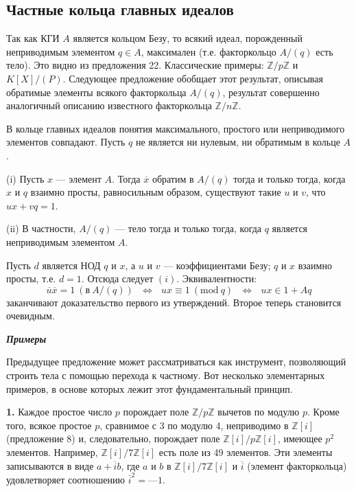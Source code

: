 \documentclass{mai_book}
\begin{document}
\subsection{Частные кольца главных идеалов}
Так как КГИ $A$ является кольцом Безу, то всякий идеал,  
порожденный неприводимым элементом $q \in A$, максимален (т.е. факторкольцо 
$A\slash(q)$ есть тело). Это видно из предложения 22. Классические примеры: 
$\mathbb{Z}\slash p\mathbb{Z}$ и $K[X]\slash(P)$. Следующее предложение обобщает этот результат, 
описывая обратимые элементы всякого факторкольца $A\slash(q)$, результат 
совершенно аналогичный описанию известного факторкольца $\mathbb{Z}\slash n\mathbb{Z}$. 
\begin{predl}

\hspace*{15pt}В кольце главных идеалов понятия максимального, простого или 
неприводимого элементов совпадают. Пусть $q$ не является ни нулевым, 
ни обратимым в кольце $A$. 

(i) Пусть $x$ — элемент $A$. Тогда $\overline{x}$ обратим в $A\slash(q)$ тогда и только 
тогда, когда $x$ и $q$ взаимно просты, равносильным образом, существуют 
такие $u$ и $v$, что $ux + vq = 1$. 

(ii) В частности, $A\slash(q)$ — тело тогда и только тогда, когда $q$  
является неприводимым элементом $A$. 
\end{predl}
\begin{myproof}
Пусть $d$ является НОД $q$ и $x$, а $u$ и $v$ — коэффициентами Безу; $q$ и $x$ 
взаимно просты, т.е. $d = 1$. Отсюда следует $(i)$. Эквивалентности: 
\begin{equation*}
\overline{u}\overline{x} = 1\: (\text{в}\: A\slash (q))\:\:\: \Leftrightarrow\:\:\: ux \equiv 1\: (\text{mod}\:q)\:\:\: \Leftrightarrow \:\:\: ux \in 1 + Aq
\end{equation*}
заканчивают доказательство первого из утверждений. Второе теперь
 становится очевидным. 
\end{myproof}

\noindent\textbf{\textit{Примеры}}

Предыдущее предложение может рассматриваться как инструмент, 
позволяющий строить тела с помощью перехода к частному. Вот  
несколько элементарных примеров, в основе которых лежит этот  
фундаментальный принцип. 
\newpage

\textbf{1.} Каждое простое число $p$ порождает поле $\mathbb{Z}\slash p\mathbb{Z}$ вычетов по  
модулю $p$. Кроме того, всякое простое $p$, сравнимое с 3 по модулю 4, 
неприводимо в $\mathbb{Z}[i]$ (предложение 8) и, следовательно, порождает поле 
$\mathbb{Z}[i]\slash p\mathbb{Z}[i]$, имеющее $p^2$ элементов. Например, $\mathbb{Z}[i]\slash 7\mathbb{Z}[i]$ есть поле из 49 
элементов. Эти элементы записываются в виде $a+\overline{i}b$, где $a$ и $b$ в $\mathbb{Z}[i]\slash 7\mathbb{Z}[i]$
и $\overline{i}$ (элемент факторкольца) удовлетворяет соотношению $\overline{i}^2 = — 1.$
\end{document}
